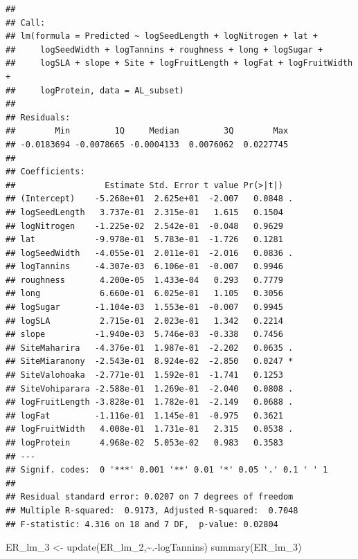 \documentclass[
  12pt,
]{article}
\newenvironment{Shaded}{\begin{snugshade}}{\end{snugshade}}
\newcommand{\FunctionTok}[1]{\textcolor[rgb]{0.00,0.00,0.00}{#1}}
\newcommand{\NormalTok}[1]{#1}
\newcommand{\OtherTok}[1]{\textcolor[rgb]{0.56,0.35,0.01}{#1}}
\newcommand{\SpecialCharTok}[1]{\textcolor[rgb]{0.00,0.00,0.00}{#1}}
\begin{document}
\begin{verbatim}
## 
## Call:
## lm(formula = Predicted ~ logSeedLength + logNitrogen + lat + 
##     logSeedWidth + logTannins + roughness + long + logSugar + 
##     logSLA + slope + Site + logFruitLength + logFat + logFruitWidth + 
##     logProtein, data = AL_subset)
## 
## Residuals:
##        Min         1Q     Median         3Q        Max 
## -0.0183694 -0.0078665 -0.0004133  0.0076062  0.0227745 
## 
## Coefficients:
##                  Estimate Std. Error t value Pr(>|t|)  
## (Intercept)    -5.268e+01  2.625e+01  -2.007   0.0848 .
## logSeedLength   3.737e-01  2.315e-01   1.615   0.1504  
## logNitrogen    -1.225e-02  2.542e-01  -0.048   0.9629  
## lat            -9.978e-01  5.783e-01  -1.726   0.1281  
## logSeedWidth   -4.055e-01  2.011e-01  -2.016   0.0836 .
## logTannins     -4.307e-03  6.106e-01  -0.007   0.9946  
## roughness       4.200e-05  1.433e-04   0.293   0.7779  
## long            6.660e-01  6.025e-01   1.105   0.3056  
## logSugar       -1.104e-03  1.553e-01  -0.007   0.9945  
## logSLA          2.715e-01  2.023e-01   1.342   0.2214  
## slope          -1.940e-03  5.746e-03  -0.338   0.7456  
## SiteMaharira   -4.376e-01  1.987e-01  -2.202   0.0635 .
## SiteMiaranony  -2.543e-01  8.924e-02  -2.850   0.0247 *
## SiteValohoaka  -2.771e-01  1.592e-01  -1.741   0.1253  
## SiteVohiparara -2.588e-01  1.269e-01  -2.040   0.0808 .
## logFruitLength -3.828e-01  1.782e-01  -2.149   0.0688 .
## logFat         -1.116e-01  1.145e-01  -0.975   0.3621  
## logFruitWidth   4.008e-01  1.731e-01   2.315   0.0538 .
## logProtein      4.968e-02  5.053e-02   0.983   0.3583  
## ---
## Signif. codes:  0 '***' 0.001 '**' 0.01 '*' 0.05 '.' 0.1 ' ' 1
## 
## Residual standard error: 0.0207 on 7 degrees of freedom
## Multiple R-squared:  0.9173, Adjusted R-squared:  0.7048 
## F-statistic: 4.316 on 18 and 7 DF,  p-value: 0.02804
\end{verbatim}

\begin{Shaded}
\begin{Highlighting}[]
\NormalTok{ER\_lm\_3 }\OtherTok{\textless{}{-}} \FunctionTok{update}\NormalTok{(ER\_lm\_2,}\SpecialCharTok{\textasciitilde{}}\NormalTok{.}\SpecialCharTok{{-}}\NormalTok{logTannins)}
\FunctionTok{summary}\NormalTok{(ER\_lm\_3)}
\end{Highlighting}
\end{Shaded}
\end{document}
